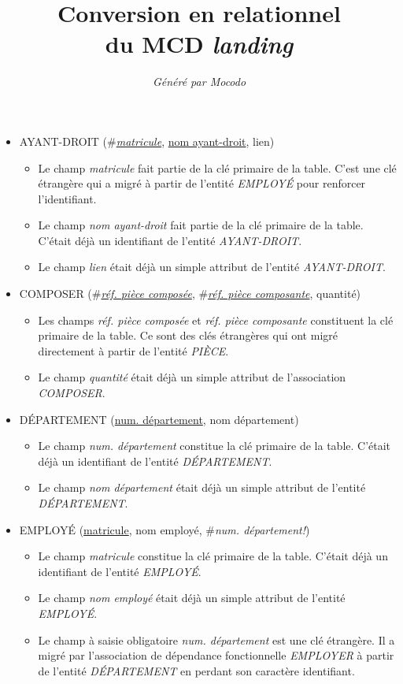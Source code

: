 \documentclass[a4paper]{article}
\title{Conversion en relationnel\\du MCD \emph{landing}}
\author{\emph{Généré par Mocodo}}
\newcommand{\relat}[1]{\textsc{#1}}
\newcommand{\attr}[1]{#1}
\newcommand{\prim}[1]{\uline{#1}}
\newcommand{\foreign}[1]{\#\textsl{#1}}
\begin{document}
\maketitle

\begin{itemize}
  \item \relat{AYANT-DROIT} (\foreign{\prim{matricule}}, \prim{nom ayant-droit}, \attr{lien})
  \begin{itemize}
    \item Le champ \emph{matricule} fait partie de la clé primaire de la table. C'est une clé étrangère qui a migré à partir de l'entité \emph{EMPLOYÉ} pour renforcer l'identifiant.
    \item Le champ \emph{nom ayant-droit} fait partie de la clé primaire de la table. C'était déjà un identifiant de l'entité \emph{AYANT-DROIT}.
    \item Le champ \emph{lien} était déjà un simple attribut de l'entité \emph{AYANT-DROIT}.
  \end{itemize}

  \item \relat{COMPOSER} (\foreign{\prim{réf. pièce composée}}, \foreign{\prim{réf. pièce composante}}, \attr{quantité})
  \begin{itemize}
    \item Les champs \emph{réf. pièce composée} et \emph{réf. pièce composante} constituent la clé primaire de la table. Ce sont des clés étrangères qui ont migré directement à partir de l'entité \emph{PIÈCE}.
    \item Le champ \emph{quantité} était déjà un simple attribut de l'association \emph{COMPOSER}.
  \end{itemize}

  \item \relat{DÉPARTEMENT} (\prim{num. département}, \attr{nom département})
  \begin{itemize}
    \item Le champ \emph{num. département} constitue la clé primaire de la table. C'était déjà un identifiant de l'entité \emph{DÉPARTEMENT}.
    \item Le champ \emph{nom département} était déjà un simple attribut de l'entité \emph{DÉPARTEMENT}.
  \end{itemize}

  \item \relat{EMPLOYÉ} (\prim{matricule}, \attr{nom employé}, \foreign{num. département!})
  \begin{itemize}
    \item Le champ \emph{matricule} constitue la clé primaire de la table. C'était déjà un identifiant de l'entité \emph{EMPLOYÉ}.
    \item Le champ \emph{nom employé} était déjà un simple attribut de l'entité \emph{EMPLOYÉ}.
    \item Le champ à saisie obligatoire \emph{num. département} est une clé étrangère. Il a migré par l'association de dépendance fonctionnelle \emph{EMPLOYER} à partir de l'entité \emph{DÉPARTEMENT} en perdant son caractère identifiant.
  \end{itemize}


\end{itemize}
\end{document}
